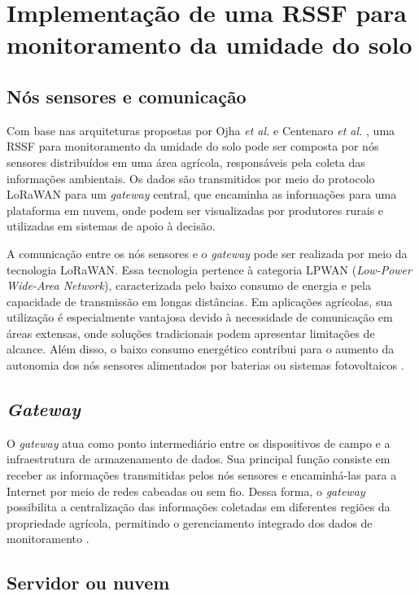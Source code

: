 \documentclass[conference]{IEEEtran}
\begin{document}
\section{Implementação de uma RSSF para monitoramento da umidade do solo}

\subsection{Nós sensores e comunicação}

Com base nas arquiteturas propostas por Ojha \emph{et al.} \cite{ojha2015} e Centenaro \emph{et al.} \cite{centenaro2016}, uma RSSF para monitoramento da umidade do solo pode ser composta por nós sensores distribuídos em uma área agrícola, responsáveis pela coleta das informações ambientais. Os dados são transmitidos por meio do protocolo LoRaWAN para um \emph{gateway} central, que encaminha as informações para uma plataforma em nuvem, onde podem ser visualizadas por produtores rurais e utilizadas em sistemas de apoio à decisão.

A comunicação entre os nós sensores e o \emph{gateway} pode ser realizada por meio da tecnologia LoRaWAN. Essa tecnologia pertence à categoria LPWAN (\emph{Low-Power Wide-Area Network}), caracterizada pelo baixo consumo de energia e pela capacidade de transmissão em longas distâncias. Em aplicações agrícolas, sua utilização é especialmente vantajosa devido à necessidade de comunicação em áreas extensas, onde soluções tradicionais podem apresentar limitações de alcance. Além disso, o baixo consumo energético contribui para o aumento da autonomia dos nós sensores alimentados por baterias ou sistemas fotovoltaicos \cite{centenaro2016}.

\subsection{\emph{Gateway}}

O \emph{gateway} atua como ponto intermediário entre os dispositivos de campo e a infraestrutura de armazenamento de dados. Sua principal função consiste em receber as informações transmitidas pelos nós sensores e encaminhá-las para a Internet por meio de redes cabeadas ou sem fio. Dessa forma, o \emph{gateway} possibilita a centralização das informações coletadas em diferentes regiões da propriedade agrícola, permitindo o gerenciamento integrado dos dados de monitoramento \cite{ojha2015,centenaro2016}.

\subsection{Servidor ou nuvem}
\end{document}
